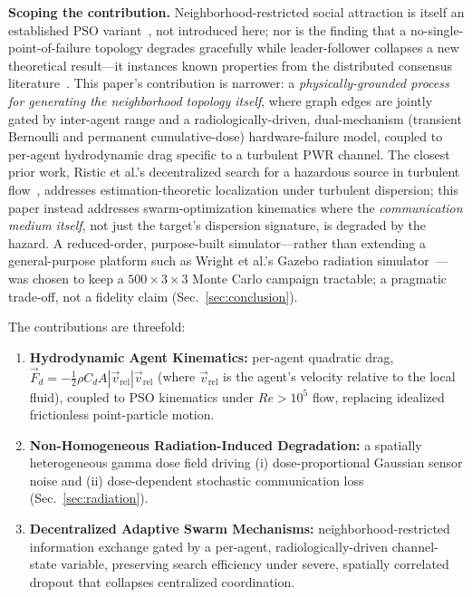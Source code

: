 \documentclass[conference]{IEEEtran}
\begin{document}
\textbf{Scoping the contribution.} Neighborhood-restricted social attraction is itself an established PSO variant~\cite{kennedy_small_worlds,mendes_fips}, not introduced here; nor is the finding that a no-single-point-of-failure topology degrades gracefully while leader-follower collapses a new theoretical result---it instances known properties from the distributed consensus literature~\cite{olfati_saber_murray}. This paper's contribution is narrower: a \emph{physically-grounded process for generating the neighborhood topology itself}, where graph edges are jointly gated by inter-agent range and a radiologically-driven, dual-mechanism (transient Bernoulli and permanent cumulative-dose) hardware-failure model, coupled to per-agent hydrodynamic drag specific to a turbulent PWR channel. The closest prior work, Ristic et al.'s decentralized search for a hazardous source in turbulent flow~\cite{ristic_turbulent_search}, addresses estimation-theoretic localization under turbulent dispersion; this paper instead addresses swarm-optimization kinematics where the \emph{communication medium itself}, not just the target's dispersion signature, is degraded by the hazard. A reduced-order, purpose-built simulator---rather than extending a general-purpose platform such as Wright et al.'s Gazebo radiation simulator~\cite{wright_gazebo_radiation}---was chosen to keep a $500\times3\times3$ Monte Carlo campaign tractable; a pragmatic trade-off, not a fidelity claim (Sec.~\ref{sec:conclusion}).

The contributions are threefold:
\begin{enumerate}
\item \textbf{Hydrodynamic Agent Kinematics:} per-agent quadratic drag, $\vec{F}_d = -\tfrac{1}{2}\rho C_d A |\vec{v}_{\text{rel}}|\vec{v}_{\text{rel}}$ (where $\vec{v}_{\text{rel}}$ is the agent's velocity relative to the local fluid), coupled to PSO kinematics under $Re>10^5$ flow, replacing idealized frictionless point-particle motion.
\item \textbf{Non-Homogeneous Radiation-Induced Degradation:} a spatially heterogeneous gamma dose field driving (i) dose-proportional Gaussian sensor noise and (ii) dose-dependent stochastic communication loss (Sec.~\ref{sec:radiation}).
\item \textbf{Decentralized Adaptive Swarm Mechanisms:} neighborhood-restricted information exchange gated by a per-agent, radiologically-driven channel-state variable, preserving search efficiency under severe, spatially correlated dropout that collapses centralized coordination.
\end{enumerate}
\end{document}

